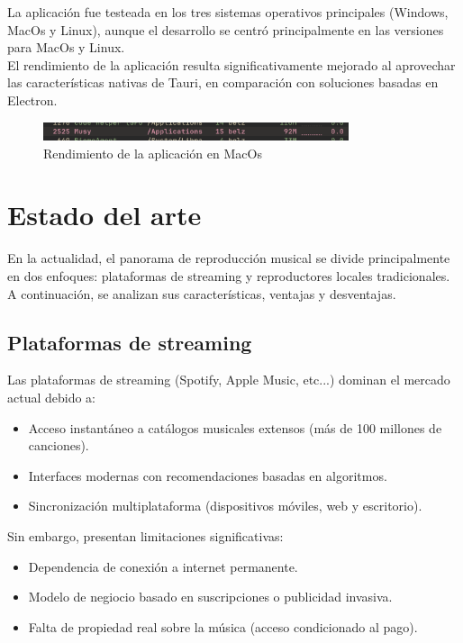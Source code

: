 \documentclass[11pt, a4paper]{article}
\begin{document}
        La aplicación fue testeada en los tres sistemas operativos principales (Windows, MacOs y Linux), aunque el desarrollo se centró principalmente en las versiones para MacOs y Linux. \\

        El rendimiento de la aplicación resulta significativamente mejorado al aprovechar las características nativas de Tauri, en comparación con soluciones basadas en Electron. \\

        \begin{figure}[h!]
            \centering
            \includegraphics[width=0.8\textwidth]{media/imagemusyram.png}
            \caption{Rendimiento de la aplicación en MacOs}
            \label{fig:ejemplo}
        \end{figure}

\section{Estado del arte}

En la actualidad, el panorama de reproducción musical se divide principalmente en dos enfoques: plataformas de streaming y reproductores locales tradicionales. A continuación, se analizan sus características, ventajas y desventajas.

        \subsection{Plataformas de streaming}

        Las plataformas de streaming (Spotify, Apple Music, etc...) dominan el mercado actual debido a:

        \begin{itemize}
            \item Acceso instantáneo a catálogos musicales extensos (más de 100 millones de canciones).
            \item Interfaces modernas con recomendaciones basadas en algoritmos.
            \item Sincronización multiplataforma (dispositivos móviles, web y escritorio).
        \end{itemize}

        Sin embargo, presentan limitaciones significativas:

        \begin{itemize}
            \item Dependencia de conexión a internet permanente.
            \item Modelo de negiocio basado en suscripciones o publicidad invasiva.
            \item Falta de propiedad real sobre la música (acceso condicionado al pago).
        \end{itemize}
\end{document}
